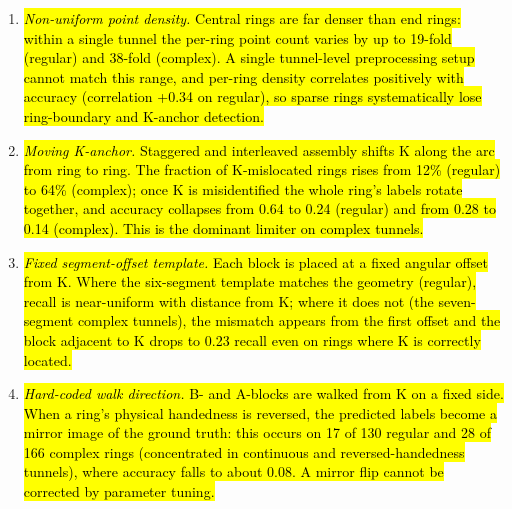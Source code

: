 \documentclass[a4paper,fleqn]{cas-dc}
\begin{document}
{\begin{enumerate}
\item \hl{\emph{Non-uniform point density.} Central rings are far denser than end rings: within a single tunnel the per-ring point count varies by up to 19-fold (regular) and 38-fold (complex). A single tunnel-level preprocessing setup cannot match this range, and per-ring density correlates positively with accuracy (correlation +0.34 on regular), so sparse rings systematically lose ring-boundary and K-anchor detection.}
\item \hl{\emph{Moving K-anchor.} Staggered and interleaved assembly shifts K along the arc from ring to ring. The fraction of K-mislocated rings rises from 12\% (regular) to 64\% (complex); once K is misidentified the whole ring's labels rotate together, and accuracy collapses from 0.64 to 0.24 (regular) and from 0.28 to 0.14 (complex). This is the dominant limiter on complex tunnels.}
\item \hl{\emph{Fixed segment-offset template.} Each block is placed at a fixed angular offset from K. Where the six-segment template matches the geometry (regular), recall is near-uniform with distance from K; where it does not (the seven-segment complex tunnels), the mismatch appears from the first offset and the block adjacent to K drops to 0.23 recall even on rings where K is correctly located.}
\item \hl{\emph{Hard-coded walk direction.} B- and A-blocks are walked from K on a fixed side. When a ring's physical handedness is reversed, the predicted labels become a mirror image of the ground truth: this occurs on 17 of 130 regular and 28 of 166 complex rings (concentrated in continuous and reversed-handedness tunnels), where accuracy falls to about 0.08. A mirror flip cannot be corrected by parameter tuning.}
\end{enumerate}

}
\end{document}
